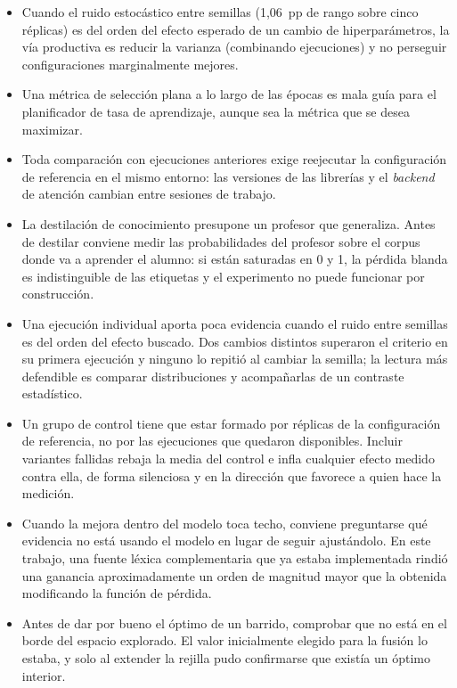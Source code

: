 \begin{itemize}
 \item Cuando el ruido estocástico entre semillas (1{,}06~pp de rango sobre cinco réplicas) es del orden del efecto esperado de un cambio de hiperparámetros, la vía productiva es reducir la varianza (combinando ejecuciones) y no perseguir configuraciones marginalmente mejores.
 \item Una métrica de selección plana a lo largo de las épocas es mala guía para el planificador de tasa de aprendizaje, aunque sea la métrica que se desea maximizar.
 \item Toda comparación con ejecuciones anteriores exige reejecutar la configuración de referencia en el mismo entorno: las versiones de las librerías y el \emph{backend} de atención cambian entre sesiones de trabajo.
 \item La destilación de conocimiento presupone un profesor que generaliza. Antes de destilar conviene medir las probabilidades del profesor sobre el corpus donde va a aprender el alumno: si están saturadas en 0 y 1, la pérdida blanda es indistinguible de las etiquetas y el experimento no puede funcionar por construcción.
 \item Una ejecución individual aporta poca evidencia cuando el ruido entre semillas es del orden del efecto buscado. Dos cambios distintos superaron el criterio en su primera ejecución y ninguno lo repitió al cambiar la semilla; la lectura más defendible es comparar distribuciones y acompañarlas de un contraste estadístico.
 \item Un grupo de control tiene que estar formado por réplicas de la configuración de referencia, no por las ejecuciones que quedaron disponibles. Incluir variantes fallidas rebaja la media del control e infla cualquier efecto medido contra ella, de forma silenciosa y en la dirección que favorece a quien hace la medición.
 \item Cuando la mejora dentro del modelo toca techo, conviene preguntarse qué evidencia no está usando el modelo en lugar de seguir ajustándolo. En este trabajo, una fuente léxica complementaria que ya estaba implementada rindió una ganancia aproximadamente un orden de magnitud mayor que la obtenida modificando la función de pérdida.
 \item Antes de dar por bueno el óptimo de un barrido, comprobar que no está en el borde del espacio explorado. El valor inicialmente elegido para la fusión lo estaba, y solo al extender la rejilla pudo confirmarse que existía un óptimo interior.
\end{itemize}


